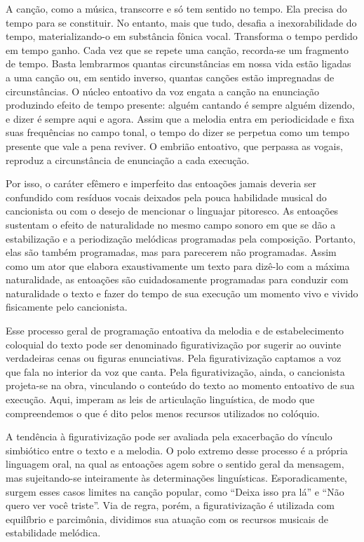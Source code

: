 A canção, como a música, transcorre e só tem sentido no tempo. Ela
precisa do tempo para se constituir. No entanto, mais que tudo, desafia
a inexorabilidade do tempo, materializando-o em substância fônica vocal.
Transforma o tempo perdido em tempo ganho. Cada vez que se repete uma
canção, recorda-se um fragmento de tempo. Basta lembrarmos quantas
circunstâncias em nossa vida estão ligadas a uma canção ou, em sentido
inverso, quantas canções estão impregnadas de circunstâncias. O núcleo
entoativo da voz engata a canção na enunciação produzindo efeito de
tempo presente: alguém cantando é sempre alguém dizendo, e dizer é
sempre aqui e agora. Assim que a melodia entra em periodicidade e fixa
suas frequências no campo tonal, o tempo do dizer se perpetua como um
tempo presente que vale a pena reviver. O embrião entoativo, que
perpassa as vogais, reproduz a circunstância de enunciação a cada
execução.

Por isso, o caráter efêmero e imperfeito das entoações jamais deveria
ser confundido com resíduos vocais deixados pela pouca habilidade
musical do cancionista ou com o desejo de mencionar o linguajar
pitoresco. As entoações sustentam o efeito de naturalidade no mesmo
campo sonoro em que se dão a estabilização e a periodização melódicas
programadas pela composição. Portanto, elas são também programadas, mas
para parecerem não programadas. Assim como um ator que elabora
exaustivamente um texto para dizê-lo com a máxima naturalidade, as
entoações são cuidadosamente programadas para conduzir com naturalidade
o texto e fazer do tempo de sua execução um momento vivo e vivido
fisicamente pelo cancionista.

Esse processo geral de programação entoativa da melodia e de
estabelecimento coloquial do texto pode ser denominado figurativização
por sugerir ao ouvinte verdadeiras cenas ou figuras enunciativas. Pela
figurativização captamos a voz que fala no interior da voz que canta.
Pela figurativização, ainda, o cancionista projeta-se na obra,
vinculando o conteúdo do texto ao momento entoativo de sua execução.
Aqui, imperam as leis de articulação linguística, de modo que
compreendemos o que é dito pelos menos recursos utilizados no colóquio.

A tendência à figurativização pode ser avaliada pela exacerbação do
vínculo simbiótico entre o texto e a melodia. O polo extremo desse
processo é a própria linguagem oral, na qual as entoações agem sobre o
sentido geral da mensagem, mas sujeitando-se inteiramente às
determinações linguísticas. Esporadicamente, surgem esses casos limites
na canção popular, como ``Deixa isso pra lá'' e ``Não quero ver você
triste''. Via de regra, porém, a figurativização é utilizada com
equilíbrio e parcimônia, dividimos sua atuação com os recursos musicais
de estabilidade melódica.

